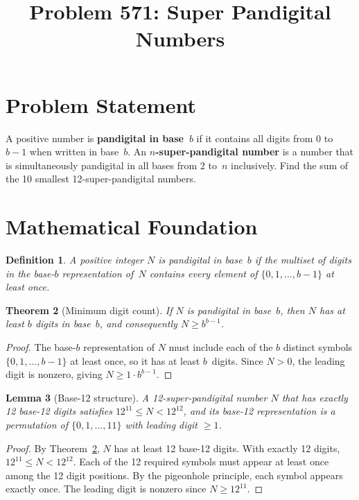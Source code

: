 \documentclass[12pt]{article}
\title{Problem 571: Super Pandigital Numbers}
\author{}
\date{}
\newtheorem{theorem}{Theorem}
\newtheorem{lemma}[theorem]{Lemma}
\newtheorem{definition}[theorem]{Definition}
\begin{document}
\maketitle

\section{Problem Statement}
A positive number is \textbf{pandigital in base~$b$} if it contains all digits from $0$ to $b-1$ when written in base~$b$. An \textbf{$n$-super-pandigital number} is a number that is simultaneously pandigital in all bases from $2$ to~$n$ inclusively. Find the sum of the 10 smallest 12-super-pandigital numbers.

\section{Mathematical Foundation}

\begin{definition}
A positive integer $N$ is \emph{pandigital in base~$b$} if the multiset of digits in the base-$b$ representation of~$N$ contains every element of $\{0,1,\ldots,b-1\}$ at least once.
\end{definition}

\begin{theorem}[Minimum digit count]\label{thm:mindigits}
If $N$ is pandigital in base~$b$, then $N$ has at least $b$ digits in base~$b$, and consequently $N \geq b^{b-1}$.
\end{theorem}

\begin{proof}
The base-$b$ representation of $N$ must include each of the $b$ distinct symbols $\{0,1,\ldots,b-1\}$ at least once, so it has at least $b$~digits. Since $N > 0$, the leading digit is nonzero, giving $N \geq 1 \cdot b^{b-1}$.
\end{proof}

\begin{lemma}[Base-12 structure]\label{lem:base12}
A 12-super-pandigital number $N$ that has exactly 12 base-12 digits satisfies $12^{11} \leq N < 12^{12}$, and its base-12 representation is a permutation of $\{0,1,\ldots,11\}$ with leading digit $\geq 1$.
\end{lemma}

\begin{proof}
By Theorem~\ref{thm:mindigits}, $N$ has at least 12 base-12 digits. With exactly 12 digits, $12^{11} \leq N < 12^{12}$. Each of the 12 required symbols must appear at least once among the 12 digit positions. By the pigeonhole principle, each symbol appears exactly once. The leading digit is nonzero since $N \geq 12^{11}$.
\end{proof}
\end{document}
